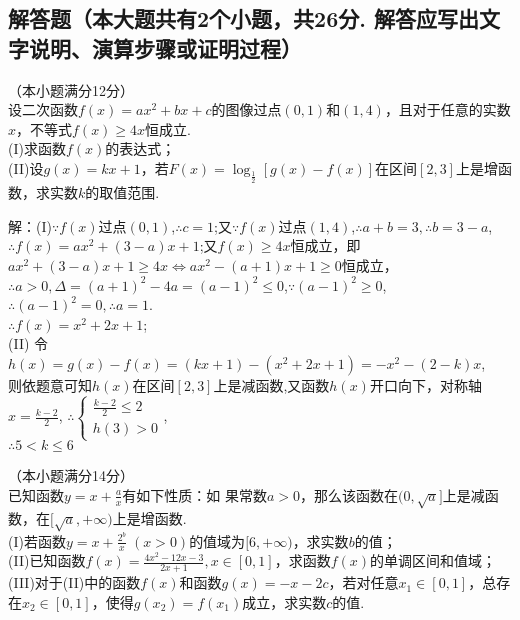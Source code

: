 \begin{exercise}
\section{解答题（本大题共有2个小题，共26分. 解答应写出文字说明、演算步骤或证明过程）}
\item
（本小题满分12分）\\
设二次函数$f(x)=ax^2+bx+c$的图像过点$(0,1)$和$(1,4)$，且对于任意的实数$x$，不等式$f(x)\geq 4x$恒成立.\\
(I)求函数$f(x)$的表达式；\\
(II)设$g(x)=kx+1$，若$F(x)=\log_{\frac{1}2}[g(x)-f(x)]$在区间$[2,3]$上是增函数，求实数$k$的取值范围.\\
\begin{answer}
  解：(I)$\because f(x)$过点$(0,1)$,$\therefore c=1$;又$\because f(x)$过点$(1,4)$,$\therefore a+b=3,\therefore b=3-a$,$\therefore f(x)=ax^2+(3-a)x+1$;又$f(x)\geq 4x$恒成立，即\\
  $ax^2+(3-a)x+1\geq 4x\Leftrightarrow ax^2-(a+1)x+1\geq 0$恒成立，$\therefore a>0,\Delta=(a+1)^2-4a=(a-1)^2\leq 0$,$\because (a-1)^2\geq 0$,$\therefore (a-1)^2=0,\therefore a=1$.\\
  $\therefore f(x)=x^2+2x+1$;\\
  (II) 令$h(x)=g(x)-f(x)=(kx+1)-(x^2+2x+1)=-x^2-(2-k)x$,\\
  则依题意可知$h(x)$在区间$[2,3]$上是减函数,又函数$h(x)$开口向下，对称轴$x=\frac{k-2}2$,
  $\therefore
  \begin{cases}
    \frac{k-2}2\leq 2\\
    h(3)>0
  \end{cases}$,\\
  $\therefore 5<k\leq 6$\\
\end{answer}
\vspace{7cm}
\item
（本小题满分14分）\\
已知函数$y=x+\frac{a}x$有如下性质：如 果常数$a>0$，那么该函数在$(0,\sqrt a]$上是减函数，在$[\sqrt a,+\infty)$上是增函数.\\
(I)若函数$y=x+\frac{2^b}x\;(x>0)$的值域为$[6,+\infty)$，求实数$b$的值；\\
(II)已知函数$f(x)=\frac{4x^2-12x-3}{2x+1},x\in[0,1]$，求函数$f(x)$的单调区间和值域；\\
(III)对于(II)中的函数$f(x)$和函数$g(x)=-x-2c$，若对任意$x_1\in[0,1]$，总存在$x_2\in[0,1]$，使得$g(x_2)=f(x_1)$成立，求实数$c$的值.\\
\begin{answer}

\end{answer}
\end{exercise}
